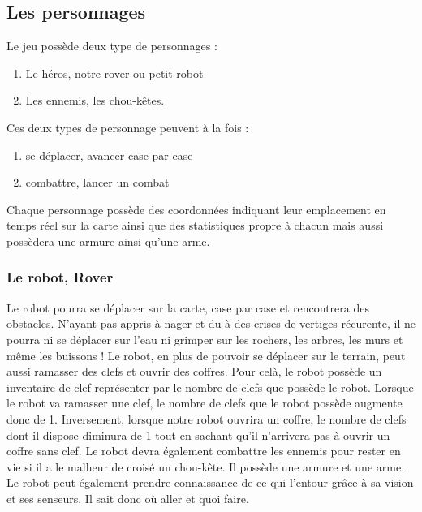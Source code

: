 \documentclass[a4paper 12pts]{article}
\begin{document}
\subsection{Les personnages}

\vspace{1cm}


Le jeu possède deux type de personnages : 

\vspace{0.5cm}

\begin{enumerate}
	\item Le héros, notre rover ou petit robot
	\item Les ennemis, les chou-kêtes.
\end{enumerate}

\vspace{0.5cm}

Ces deux types de personnage peuvent à la fois :

\vspace{0.5cm}

\begin{enumerate}
	\item se déplacer, avancer case par case 
	\item combattre, lancer un combat
\end{enumerate}

\vspace{0.5cm}

Chaque personnage possède des coordonnées indiquant leur emplacement en temps réel sur la carte ainsi que des statistiques propre à chacun mais aussi possèdera une armure ainsi qu'une arme.

\subsubsection{Le robot, Rover}


Le robot pourra se déplacer sur la carte, case par case et rencontrera des obstacles. 
N'ayant pas appris à nager et du à des crises de vertiges récurente, il ne pourra ni se déplacer sur l'eau ni grimper sur les rochers,
les arbres, les murs et même les buissons !
Le robot, en plus de pouvoir se déplacer sur le terrain, peut aussi ramasser des clefs et ouvrir des coffres.
Pour celà, le robot possède un inventaire de clef représenter par le nombre de clefs que possède le robot.
Lorsque le robot va ramasser une clef, le nombre de clefs que le robot possède augmente donc de 1.
Inversement, lorsque notre robot ouvrira un coffre, le nombre de clefs dont il dispose diminura de 1 tout en sachant qu'il n'arrivera pas à ouvrir un coffre sans clef.
Le robot devra également combattre les ennemis pour rester en vie si il a le malheur de croisé un chou-kête.
Il possède une armure et une arme.
Le robot peut également prendre connaissance de ce qui l'entour grâce à sa vision et ses senseurs. Il sait donc où aller et quoi faire.
\end{document}
